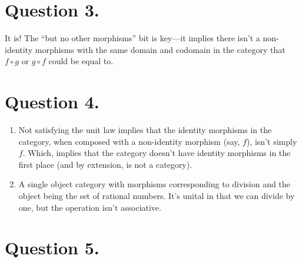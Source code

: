 \documentclass{article}
\begin{document}
\section*{Question 3.}

It is! The “but no other morphisms” bit is key—it implies there isn’t a non-identity morphisms with the same domain and codomain in the category that $f \circ g$ or $g \circ f$ could be equal to.

\section*{Question 4.}

\begin{enumerate}[label=(\alph*)]

\item Not satisfying the unit law implies that the identity morphisms in the category, when composed with a non-identity morphism (say, $f$), isn’t simply $f$. Which, implies that the category doesn’t have identity morphisms in the first place (and by extension, is not a category).

\item A single object category with morphisms corresponding to division and the object being the set of rational numbers. It's unital in that we can divide by one, but the operation isn’t associative.

\end{enumerate}

\section*{Question 5.}
\end{document}
